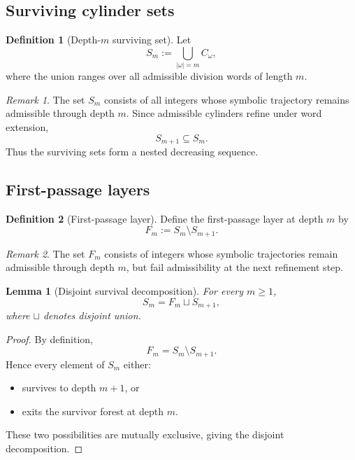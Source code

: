 \documentclass[12pt, oneside]{article}
\numberwithin{equation}{section}
\theoremstyle{definition}
\newtheorem{definition}{Definition}[section]
\theoremstyle{plain}
\newtheorem{lemma}[theorem]{Lemma}
\theoremstyle{remark}
\newtheorem*{remark}{Remark}
\begin{document}
\subsection{Surviving cylinder sets}

\begin{definition}[Depth-$m$ surviving set]
Let
\[
S_m
:=
\bigcup_{|\omega|=m} C_\omega,
\]
where the union ranges over all admissible division words of length \(m\).
\end{definition}

\begin{remark}
The set \(S_m\) consists of all integers whose symbolic trajectory
remains admissible through depth \(m\). Since admissible cylinders
refine under word extension,
\[
S_{m+1}\subseteq S_m.
\]
Thus the surviving sets form a nested decreasing sequence.
\end{remark}

\subsection{First-passage layers}

\begin{definition}[First-passage layer]
Define the first-passage layer at depth \(m\) by
\[
F_m := S_m \setminus S_{m+1}.
\]
\end{definition}

\begin{remark}
The set \(F_m\) consists of integers whose symbolic trajectories
remain admissible through depth \(m\), but fail admissibility
at the next refinement step.
\end{remark}

\begin{lemma}[Disjoint survival decomposition]
For every \(m\ge1\),
\[
S_m = F_m \sqcup S_{m+1},
\]
where \(\sqcup\) denotes disjoint union.
\end{lemma}

\begin{proof}
By definition,
\[
F_m = S_m \setminus S_{m+1}.
\]
Hence every element of \(S_m\) either:
\begin{itemize}
\item survives to depth \(m+1\), or
\item exits the survivor forest at depth \(m\).
\end{itemize}

These two possibilities are mutually exclusive, giving the disjoint decomposition.
\end{proof}
\end{document}
